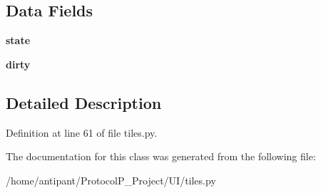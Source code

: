 \subsection*{Data Fields}
\begin{DoxyCompactItemize}
\item 
\hypertarget{classtiles_1_1StateTrackingSprite_a48096bb179aaca63dbbeff68025c2b76}{{\bfseries state}}\label{classtiles_1_1StateTrackingSprite_a48096bb179aaca63dbbeff68025c2b76}

\item 
\hypertarget{classtiles_1_1StateTrackingSprite_a371c1596b332bce434ad48e7ab9312ad}{{\bfseries dirty}}\label{classtiles_1_1StateTrackingSprite_a371c1596b332bce434ad48e7ab9312ad}

\end{DoxyCompactItemize}


\subsection{Detailed Description}


Definition at line 61 of file tiles.\-py.



The documentation for this class was generated from the following file\-:\begin{DoxyCompactItemize}
\item 
/home/antipant/\-Protocol\-P\-\_\-\-Project/\-U\-I/tiles.\-py\end{DoxyCompactItemize}
